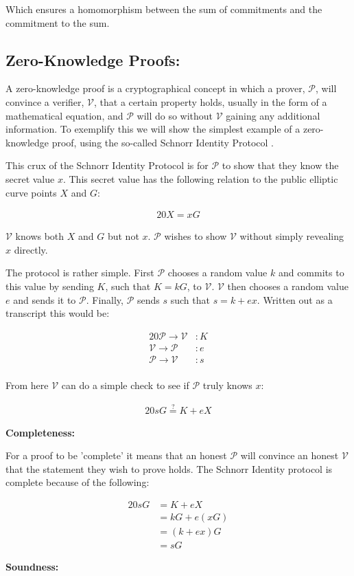 \documentclass{article}
\newcommand{\eq}[1]{\begin{alignat*}{20}#1\end{alignat*}}
\newcommand{\V}{\mathcal{V}}
\renewcommand{\P}{\mathcal{P}}
\begin{document}
Which ensures a homomorphism between the sum of commitments and the
commitment to the sum.

\subsection{Zero-Knowledge Proofs:}\label{zero-knowledge-proofs}

A zero-knowledge proof is a cryptographical concept in which a prover,
$\P$, will convince a verifier, $\V$, that a certain property holds,
usually in the form of a mathematical equation, and $\P$ will do so
without $\V$ gaining any additional information. To exemplify this we
will show the simplest example of a zero-knowledge proof, using the
so-called Schnorr Identity Protocol \cite{zkdocs-schnorr}.

This crux of the Schnorr Identity Protocol is for $\P$ to show that
they know the secret value $x$. This secret value has the following
relation to the public elliptic curve points $X$ and $G$:

\eq{
	X = xG
}

$\V$ knows both $X$ and $G$ but not $x$. $\P$ wishes to show $\V$
without simply revealing $x$ directly.

The protocol is rather simple. First $\P$ chooses a random value $k$ and
commits to this value by sending $K$, such that $K = kG$, to $\V$. $\V$
then chooses a random value $e$ and sends it to $\P$. Finally, $\P$
sends $s$ such that $s = k + ex$. Written out as a transcript this
would be:

\eq{
	\P \rightarrow \V &: K \\
	\V \rightarrow \P &: e \\
	\P \rightarrow \V &: s \\
}

From here $\V$ can do a simple check to see if $\P$ truly knows $x$:

\eq{
	sG \stackrel{?}{=} K + eX
}


\textbf{Completeness:}

For a proof to be 'complete' it means that an honest $\P$ will convince
an honest $\V$ that the statement they wish to prove holds. The Schnorr 
Identity protocol is complete because of the following:

\eq{
	sG &= K + eX \\
	   &= kG + e(xG) \\
	   &= (k + ex)G \\
	   &= sG
}

\textbf{Soundness:}
\end{document}
